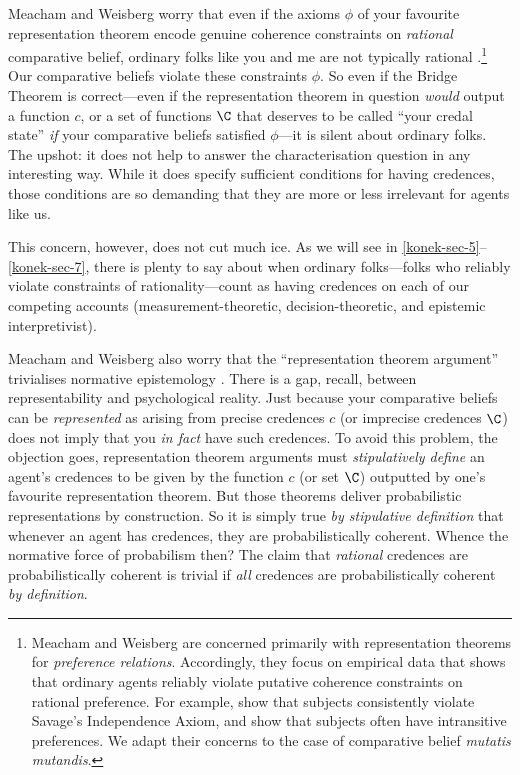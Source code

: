 Meacham and Weisberg worry that even if the axioms $\phi$ of your favourite representation theorem encode genuine coherence constraints on \textit{rational} comparative belief, ordinary folks like you and me are not typically rational \citep[pp. 7--8]{Meacham2011}.\footnote{Meacham and Weisberg are concerned primarily with representation theorems for \textit{preference relations}. Accordingly, they focus on empirical data that shows that ordinary agents reliably violate putative coherence constraints on rational preference. For example, \citet{Kahneman1979} show that subjects consistently violate Savage's Independence Axiom, and \citet{Lichtenstein1971, Lichtenstein1973} show that subjects often have intransitive preferences. We adapt their concerns to the case of comparative belief \textit{mutatis mutandis}.} Our comparative beliefs violate these constraints $\phi$. So even if the Bridge Theorem is correct---even if the representation theorem in question \textit{would} output a function $c$, or a set of functions $\C$ that deserves to be called ``your credal state'' \textit{if} your comparative beliefs satisfied $\phi$---it is silent about ordinary folks. The upshot: it does not help to answer the characterisation question in any interesting way. While it does specify sufficient conditions for having credences, those conditions are so demanding that they are more or less irrelevant for agents like us.

This concern, however, does not cut much ice. As we will see in \autoref{konek-sec-5}--\ref{konek-sec-7}, there is plenty to say about when ordinary folks---folks who reliably violate constraints of rationality---count as having credences on each of our competing accounts (measurement-theoretic, decision-theoretic, and epistemic interpretivist).

Meacham and Weisberg also worry that the ``representation theorem argument'' trivialises normative epistemology \citep[pp. 14--16]{Meacham2011}. There is a gap, recall, between representability and psychological reality. Just because your comparative beliefs can be \emph{represented} as arising from precise credences $c$ (or imprecise credences $\C$) does not imply that you \emph{in fact} have such credences. To avoid this problem, the objection goes, representation theorem arguments must \textit{stipulatively define} an agent's credences to be given by the function $c$ (or set $\C$) outputted by one's favourite representation theorem. But those theorems deliver probabilistic representations by construction. So it is simply true \textit{by stipulative definition} that whenever an agent has credences, they are probabilistically coherent. Whence the normative force of probabilism then? The claim that \textit{rational} credences are probabilistically coherent is trivial if \textit{all} credences are probabilistically coherent \textit{by definition}.

